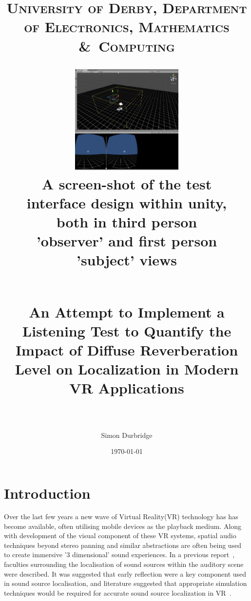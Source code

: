 \documentclass[paper=a4, fontsize=10pt, font=arial]{scrartcl} %
\title{	
\normalfont \normalsize 
\textsc{University of Derby, Department of Electronics, Mathematics \&\ Computing} \\ [25pt] %
\begin{figure}[H]
\centering
\includegraphics[width=0.5\textwidth]{overview_unity.jpg}
\centering
\caption{A screen-shot of the test interface design within unity, both in third person 'observer' and first person 'subject' views}
\end{figure}
\horrule{0.5pt} \\[0.4cm] %
\huge An Attempt to Implement a Listening Test to Quantify the Impact of Diffuse Reverberation Level on Localization in Modern VR Applications \\ %
\horrule{2pt} \\[0.5cm] %
}
\author{Simon Durbridge} %
\date{\normalsize\today} %
\numberwithin{equation}{section} %
\numberwithin{figure}{section} %
\numberwithin{table}{section} %
\begin{document}
\maketitle %

\newpage


\tableofcontents



\listoffigures

\newpage





\section{Introduction}

Over the last few years a new wave of Virtual Reality(VR) technology has has become available, often utilising mobile devices as the playback medium. Along with development of the visual component of these VR systems, spatial audio techniques beyond stereo panning and similar abstractions are often being used to create immersive '3 dimensional' sound experiences.
In a previous report~\cite{Durbridge2016b}, faculties surrounding the localisation of sound sources within the auditory scene were described. It was suggested that early reflection were a key component used in sound source localisation, and literature suggested that appropriate simulation techniques would be required for accurate sound source localization in VR~\cite{Begault1995}. 
\end{document}
